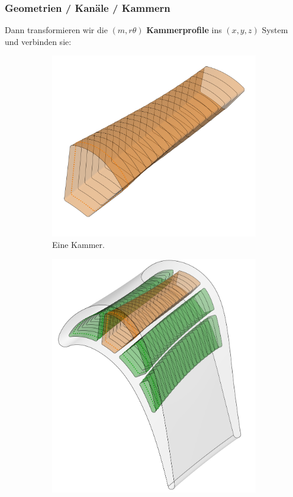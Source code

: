 \documentclass[8pt, aspectratio=169]{beamer}
\begin{document}
\begin{frame}
	\frametitle{Geometrien / Kanäle / Kammern}
	\vspace{-0.25cm}\hspace{-0.5cm}
	\centering
	\begin{minipage}[t]{\textwidth}
		Dann transformieren wir die $(m, r\theta)$ \textbf{Kammerprofile} ins $(x,y,z)$ System und verbinden sie:
		\begin{figure}[H]
			\centering
			\begin{subfigure}{.46\textwidth}
				\includegraphics[width=\textwidth]{../../tec/chambers/114.png}
				\caption{Eine Kammer.}
			\end{subfigure}
			\begin{subfigure}{.36\textwidth}
				\includegraphics[width=\textwidth]{../../tec/chambers/111.png}

\end{subfigure}
\end{figure}
\end{minipage}
\end{frame}
\end{document}
